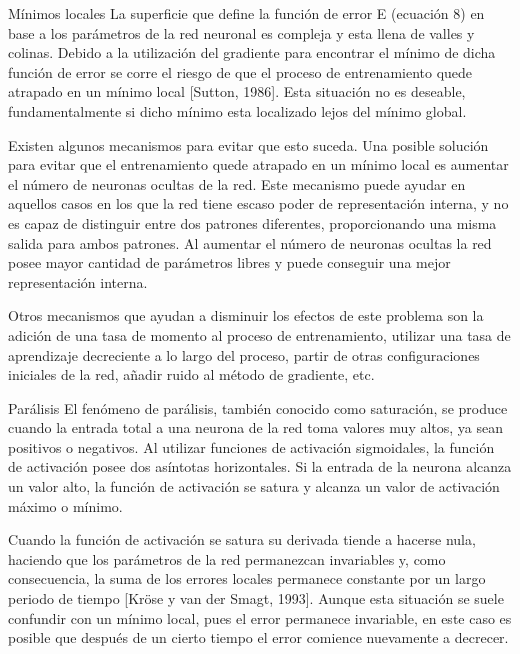 \documentclass[a4paper,11pt]{article}
\newcommand{\definicion}[1]{%
	\bfseries{\textbullet #1:}
}
\newenvironment{listaDefiniciones}%
{
\begin{list}{}%
     {  \setlength{\itemsep}{0.5ex}
	\setlength{\parsep}{0.5ex}
	\setlength{\partopsep}{0.5ex}
	\setlength{\topsep}{\dimexpr 2\itemsep}
	\setlength{\listparindent}{\dimexpr \parindent}
	\renewcommand*{\makelabel}[1]{\definicion{##1}}
	}
}
{
\end{list}
}%
\begin{document}
\begin{listaDefiniciones}
\item [M\'inimos locales] La superficie que define la funci\'on de error E (ecuaci\'on 8) en base a los par\'ametros de la red neuronal es compleja y esta llena de valles y colinas. Debido a la utilizaci\'on del gradiente para encontrar el m\'inimo de dicha funci\'on de error se corre el riesgo de que el proceso de entrenamiento quede atrapado en un m\'inimo local [Sutton, 1986]. Esta situaci\'on no es deseable, fundamentalmente si dicho m\'inimo esta localizado lejos del m\'inimo global.

 Existen algunos mecanismos para evitar que esto suceda. Una posible soluci\'on para evitar que el entrenamiento quede atrapado en un m\'inimo local es aumentar el n\'umero de neuronas ocultas de la red. Este mecanismo puede ayudar en aquellos casos en los que la red tiene escaso poder de representaci\'on interna, y no es capaz de distinguir entre dos patrones diferentes, proporcionando una misma salida para ambos patrones. Al aumentar el n\'umero de neuronas ocultas la red posee mayor cantidad de par\'ametros libres y puede conseguir una mejor representaci\'on interna.

 Otros mecanismos que ayudan a disminuir los efectos de este problema son la adici\'on de una tasa de momento al proceso de entrenamiento, utilizar una tasa de aprendizaje decreciente a lo largo del proceso, partir de otras configuraciones iniciales de la red, a\~nadir ruido al m\'etodo de gradiente, etc.

\item [Par\'alisis] El fen\'omeno de par\'alisis, tambi\'en conocido como saturaci\'on, se produce cuando la entrada total a una neurona de la red toma valores muy altos, ya sean positivos o negativos. Al utilizar funciones de activaci\'on sigmoidales, la funci\'on de activaci\'on posee dos as\'intotas horizontales. Si la entrada de la neurona alcanza un valor alto, la funci\'on de activaci\'on se satura y alcanza un valor de activaci\'on m\'aximo o m\'inimo.

 Cuando la funci\'on de activaci\'on se satura su derivada tiende a hacerse nula, haciendo que los par\'ametros de la red permanezcan invariables y, como consecuencia, la suma de los errores locales permanece constante por un largo periodo de tiempo [Kr\"ose y van der Smagt, 1993]. Aunque esta situaci\'on se suele confundir con un m\'inimo local, pues el error permanece invariable, en este caso es posible que despu\'es de un cierto tiempo el error comience nuevamente a decrecer.


\end{listaDefiniciones}
\end{document}
